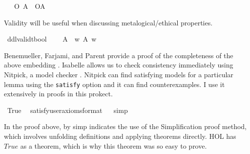 \begin{isabellebody}
\ \ \ {\isachardoublequoteopen}{\isacharparenleft}O\ {\isacharbraceleft}A{\isacharbraceright}{\isacharparenright}\ {\isasymequiv}\ {\isacharparenleft}O{\isacharbraceleft}A{\isacharbar}\isactrlbold {\isasymtop}{\isacharbraceright}{\isacharparenright}\ {\isachardoublequoteclose}\isanewline
%
%
\begin{isamarkuptext}%
Validity will be useful when discussing metalogical/ethical properties.%
\end{isamarkuptext}\isamarkuptrue%
\isamarkupfalse%
\ ddlvalid{\isacharcolon}{\isacharcolon}{\isachardoublequoteopen}t{\isasymRightarrow}bool{\isachardoublequoteclose}\ {\isacharparenleft}{\isachardoublequoteopen}{\isasymTurnstile}{\isacharunderscore}{\isachardoublequoteclose}{\isacharparenright}\isanewline
\ \ \ {\isachardoublequoteopen}{\isasymTurnstile}A\ {\isasymequiv}\ {\isasymforall}w{\isachardot}\ A\ w{\isachardoublequoteclose}\isanewline
%
\isanewline
%
\begin{isamarkuptext}%
Benemueller, Farjami, and Parent provide a proof of the completeness of the above embedding \citep{BFP}.
Isabelle allows us to check consistency immediately using Nitpick, a model checker \citep{nitpick}.
Nitpick can find satisfying models for a particular lemma using the \texttt{satisfy} option and it can 
find counterexamples. I use it extensively in proofs in this prokect.%
\end{isamarkuptext}\isamarkuptrue%
\isamarkupfalse%
\ True\ \isamarkupfalse%
\ {\isacharbrackleft}satisfy{\isacharcomma}user{\isacharunderscore}axioms{\isacharcomma}format{\isacharequal}{}{\isacharbrackright}%
\isadelimproof
\ %
\endisadelimproof
%
\isatagproof
{}\isamarkupfalse%
\ simp\isanewline
%
\isanewline
%
%
\endisatagproof
{\isafoldproof}%
%
\isadelimproof
%
\endisadelimproof
%
\begin{isamarkuptext}%
In the proof above, {\color{red} by simp} indicates the use of the Simplification proof method, 
which involves unfolding definitions and applying theorems directly. HOL has $True$ as a theorem,
which is why this theorem was so easy to prove.%
\end{isamarkuptext}\isamarkuptrue%
%
\isadelimtheory
%
\endisadelimtheory
%
\isatagtheory
%
\endisatagtheory
{\isafoldtheory}%
%
\isadelimtheory
%
\endisadelimtheory
%
\end{isabellebody}%
